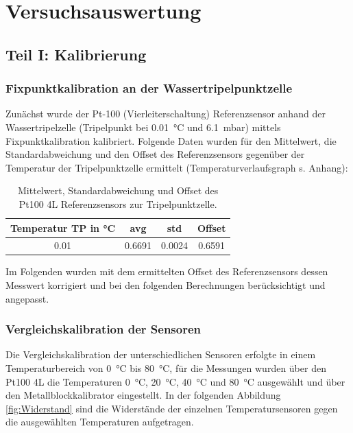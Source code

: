 \section{Versuchsauswertung}

\subsection{Teil I: Kalibrierung}

\subsubsection{Fixpunktkalibration an der Wassertripelpunktzelle}

Zunächst wurde der Pt-100 (Vierleiterschaltung) Referenzsensor anhand der Wassertripelzelle (Tripelpunkt bei \SI{0,01}{\celsius} und \SI{6,1}{\milli\bar}) mittels Fixpunktkalibration kalibriert. 
Folgende Daten wurden für den Mittelwert, die Standardabweichung und den Offset des Referenzsensors gegenüber der Temperatur der Tripelpunktzelle ermittelt (Temperaturverlaufsgraph s. Anhang): 

\begin{table}[H]
	\centering
	\caption{Mittelwert, Standardabweichung und Offset des Pt100 4L Referenzsensors zur Tripelpunktzelle.}
	\label{tab:VergleichTPZ}
	\begin{tabular}{cccc}
		Temperatur TP in \si{\celsius} & avg & std & Offset \\ 
		\hline 
		\num{0.01} & \num{0.6691} & \num{0.0024} &  \num{0.6591}\\ 
	\end{tabular} 
\end{table}


Im Folgenden wurden mit dem ermittelten Offset des Referenzsensors dessen Messwert korrigiert und bei den folgenden Berechnungen berücksichtigt und angepasst. 

\subsubsection{Vergleichskalibration der Sensoren}

Die Vergleichskalibration der unterschiedlichen Sensoren erfolgte in einem Temperaturbereich von \SI{0}{\celsius} bis \SI{80}{\celsius}, für die Messungen wurden über den Pt100 4L die Temperaturen \SI{0}{\celsius}, \SI{20}{\celsius}, \SI{40}{\celsius} und \SI{80}{\celsius} ausgewählt und über den Metallblockkalibrator eingestellt. In der folgenden Abbildung \ref{fig:Widerstand} sind die Widerstände der einzelnen Temperatursensoren gegen die ausgewählten Temperaturen aufgetragen. 

